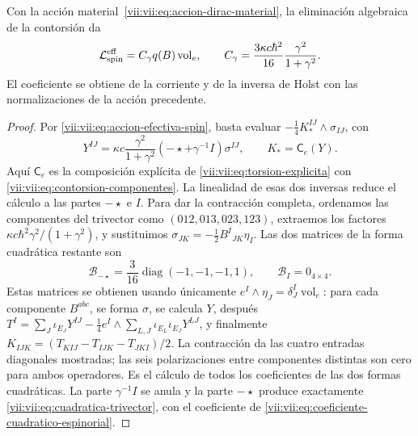 \begin{theorem}
\label{vii:vii:thm:coeficiente-torsional-espinorial}
Con la acción material~\eqref{vii:vii:eq:accion-dirac-material}, la
eliminación algebraica de la contorsión da
\begin{equation}
 \mathcal L_{\rm spin}^{\rm eff}
 =C_\gamma q(B)\operatorname{vol}_e,\qquad
 C_\gamma=\frac{3\kappa c\hbar^2}{16}
                      \frac{\gamma^2}{1+\gamma^2}.
 \label{vii:vii:eq:coeficiente-cuadratico-espinorial}
\end{equation}
El coeficiente se obtiene de la corriente y de la inversa de Holst
con las normalizaciones de la acción precedente.
\end{theorem}
\begin{proof}
Por \eqref{vii:vii:eq:accion-efectiva-spin}, basta evaluar
\(-\frac14K_*^{IJ}\wedge\sigma_{IJ}\), con
\[
 Y^{IJ}=\kappa c\frac{\gamma^2}{1+\gamma^2}
           (-\star+\gamma^{-1}I)\sigma^{IJ},\qquad
 K_*=\mathsf C_e(Y).
\]
Aquí \(\mathsf C_e\) es la composición explícita de
\eqref{vii:vii:eq:torsion-explicita} con
\eqref{vii:vii:eq:contorsion-componentes}. La linealidad de esas dos
inversas reduce el cálculo a las partes \(-\star\) e \(I\).
Para dar la contracción completa, ordenamos las componentes del
trivector como \((012,013,023,123)\), extraemos los factores
\(\kappa c\hbar^2\gamma^2/(1+\gamma^2)\), y sustituimos
\(\sigma_{JK}=-\frac12B^I{}_{JK}\eta_I\). Las dos matrices
de la forma cuadrática restante son
\begin{equation}
 \mathcal B_{-\star}
 =\frac3{16}\operatorname{diag}(-1,-1,-1,1),\qquad
 \mathcal B_I=0_{4\times4}.
 \label{vii:vii:eq:matrices-contraccion-espinorial}
\end{equation}
Estas matrices se obtienen usando únicamente
\(e^I\wedge\eta_J=\delta_J^I\operatorname{vol}_e\): para
cada componente \(B^{abc}\), se forma \(\sigma\), se calcula
\(Y\), después
\(T^I=\sum_J\iota_{E_J}Y^{IJ}
 -\frac14e^I\wedge\sum_{L,J}\iota_{E_L}\iota_{E_J}Y^{LJ}\),
y finalmente
\(K_{IJK}=(T_{KIJ}-T_{IJK}-T_{JKI})/2\).
La contracción da las cuatro entradas diagonales mostradas; las
seis polarizaciones entre componentes distintas son cero para ambos
operadores. Es el cálculo de todos los coeficientes de las dos
formas cuadráticas. La parte \(\gamma^{-1}I\) se anula y la parte
\(-\star\) produce exactamente \eqref{vii:vii:eq:cuadratica-trivector},
con el coeficiente de \eqref{vii:vii:eq:coeficiente-cuadratico-espinorial}.
\end{proof}

